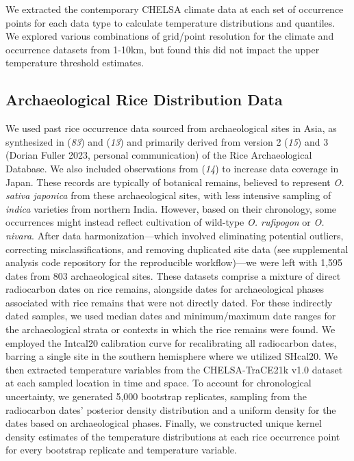 \documentclass[
  letterpaper,
  DIV=11,
  numbers=noendperiod]{scrartcl}
\begin{document}
We extracted the contemporary CHELSA climate data at each set of
occurrence points for each data type to calculate temperature
distributions and quantiles. We explored various combinations of
grid/point resolution for the climate and occurrence datasets from
1-10km, but found this did not impact the upper temperature threshold
estimates.

\subsection{Archaeological Rice Distribution
Data}\label{archaeological-rice-distribution-data}

We used past rice occurrence data sourced from archaeological sites in
Asia, as synthesized in (\emph{83}) and (\emph{13}) and primarily
derived from version 2 (\emph{15}) and 3 (Dorian Fuller 2023, personal
communication) of the Rice Archaeological Database. We also included
observations from (\emph{14}) to increase data coverage in Japan. These
records are typically of botanical remains, believed to represent
\emph{O. sativa japonica} from these archaeological sites, with less
intensive sampling of \emph{indica} varieties from northern India.
However, based on their chronology, some occurrences might instead
reflect cultivation of wild-type \emph{O. rufipogon} or \emph{O.
nivara}. After data harmonization---which involved eliminating potential
outliers, correcting misclassifications, and removing duplicated site
data (see supplemental analysis code repository for the reproducible
workflow)---we were left with 1,595 dates from 803 archaeological sites.
These datasets comprise a mixture of direct radiocarbon dates on rice
remains, alongside dates for archaeological phases associated with rice
remains that were not directly dated. For these indirectly dated
samples, we used median dates and minimum/maximum date ranges for the
archaeological strata or contexts in which the rice remains were found.
We employed the Intcal20 calibration curve for recalibrating all
radiocarbon dates, barring a single site in the southern hemisphere
where we utilized SHcal20. We then extracted temperature variables from
the CHELSA-TraCE21k v1.0 dataset at each sampled location in time and
space. To account for chronological uncertainty, we generated 5,000
bootstrap replicates, sampling from the radiocarbon dates' posterior
density distribution and a uniform density for the dates based on
archaeological phases. Finally, we constructed unique kernel density
estimates of the temperature distributions at each rice occurrence point
for every bootstrap replicate and temperature variable.
\end{document}

